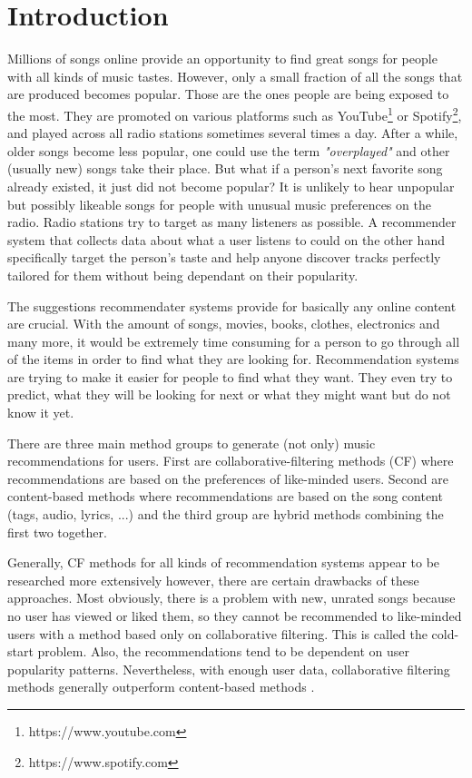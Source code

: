 \chapter*{Introduction}

Millions of songs online provide an opportunity to find great songs for people with all kinds of music tastes. However, only a small fraction of all the songs that are produced becomes popular. Those are the ones people are being exposed to the most. They are promoted on various platforms such as YouTube\footnote{https://www.youtube.com} or Spotify\footnote{https://www.spotify.com}, and played across all radio stations sometimes several times a day. After a while, older songs become less popular, one could use the term \textit{"overplayed"} and other (usually new) songs take their place. But what if a person's next favorite song already existed, it just did not become popular? It is unlikely to hear unpopular but possibly likeable songs for people with unusual music preferences on the radio. Radio stations try to target as many listeners as possible. A recommender system that collects data about what a user listens to could on the other hand specifically target the person's taste and help anyone discover tracks perfectly tailored for them without being dependant on their popularity.

The suggestions recommendater systems provide for basically any online content are crucial. With the amount of songs, movies, books, clothes, electronics and many more, it would be extremely time consuming for a person to go through all of the items in order to find what they are looking for. Recommendation systems are trying to make it easier for people to find what they want. They even try to predict, what they will be looking for next or what they might want but do not know it yet. 

There are three main method groups to generate (not only) music recommendations for users. First are collaborative-filtering methods (CF) where recommendations are based on the preferences of like-minded users. Second are content-based methods where recommendations are based on the song content (tags, audio, lyrics, ...) and the third group are hybrid methods combining the first two together. 

Generally, CF methods for all kinds of recommendation systems appear to be researched more extensively \cite{DBLP:journals/corr/abs-1712-07525} however, there are certain drawbacks of these approaches. Most obviously, there is a problem with new, unrated songs because no user has viewed or liked them, so they cannot be recommended to like-minded users with a method based only on collaborative filtering. This is called the cold-start problem. Also, the recommendations tend to be dependent on user popularity patterns. Nevertheless, with enough user data, collaborative filtering methods generally outperform content-based methods \cite{van2013deep}. 

